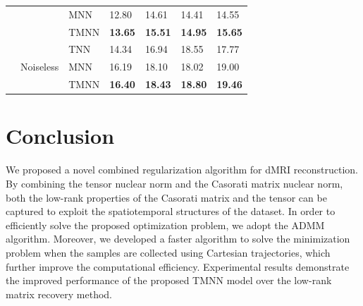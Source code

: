 \documentclass{article}
\begin{document}
\begin{table}[h]
\begin{tabular}{cclllll}
                                                                             &                            & MNN  & 12.80                  & 14.61                  & 14.41                   & 14.55                   \\
                                                                             &                            & TMNN & \textbf{13.65}         & \textbf{15.51}         & \textbf{14.95}          & \textbf{15.65}          \\ \cline{2-7} 
                                                                             & \multirow{3}{*}{Noiseless} & TNN  & 14.34                  & 16.94                  & 18.55                   & 17.77                   \\
                                                                             &                            & MNN  & 16.19                  & 18.10                  & 18.02                   & 19.00                   \\
                                                                             &                            & TMNN & \textbf{16.40}         & \textbf{18.43}         & \textbf{18.80}          & \textbf{19.46}          \\ \hline
    \end{tabular}
  \end{table}

\section{Conclusion}
\label{conclude}

We proposed a novel combined regularization algorithm for dMRI reconstruction. By combining the tensor nuclear norm and the Casorati matrix nuclear norm, both the low-rank properties of the Casorati matrix and the tensor can be captured to exploit the spatiotemporal structures of the dataset. In order to efficiently solve the proposed optimization problem, we adopt the ADMM algorithm. Moreover, we developed a faster algorithm to solve the minimization problem when the samples are collected using Cartesian trajectories, which further improve the computational efficiency. Experimental results demonstrate the improved performance of the proposed TMNN model over the low-rank matrix recovery method. 







\end{document}
